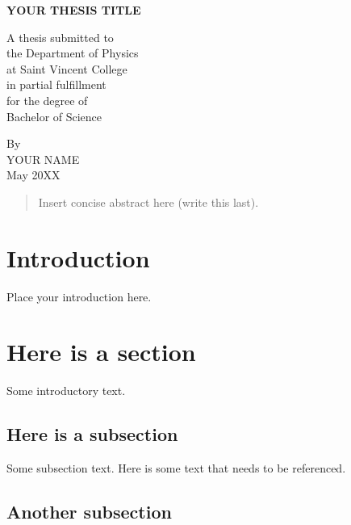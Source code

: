 \documentclass[longbibliography, 12pt]{article}
\begin{document}
	\begin{titlepage}
		\begin{center}
		
			
			\textbf{YOUR THESIS TITLE}
			
			\vspace{5.5cm}
			A thesis submitted to\\ the Department of Physics\\ at Saint Vincent College\\ in partial fulfillment\\ for the degree of\\ Bachelor of Science
			
			\vspace{4.5cm}			
			By\\
			YOUR NAME\\
			May 20XX
			
			
		\end{center}
	\end{titlepage}

\newpage
\begin{abstract}
	
	Insert concise abstract here (write this last).
	
	
	
	
\end{abstract}

\newpage
\tableofcontents
\newpage
		
\section{Introduction}
	
Place your introduction here.
	
	
\newpage %
	
\section{Here is a section}

Some introductory text.
\subsection{Here is a subsection} 
Some subsection text. Here is some text that needs to be referenced.\cite{Zettili2009}
	
 \subsection{Another subsection}
 
\end{document}
